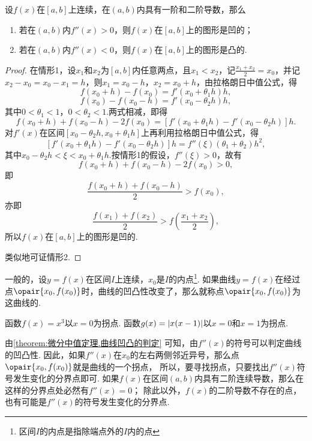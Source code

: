 \begin{theorem}[曲线凹凸的判定]\label{theorem:微分中值定理.曲线凹凸的判定}
设\(f(x)\)在\([a,b]\)上连续，在\((a,b)\)内具有一阶和二阶导数，那么
\begin{enumerate}
\item 若在\((a,b)\)内\(f''(x)>0\)，则\(f(x)\)在\([a,b]\)上的图形是凹的；
\item 若在\((a,b)\)内\(f''(x)<0\)，则\(f(x)\)在\([a,b]\)上的图形是凸的.
\end{enumerate}
\begin{proof}
在情形1，设\(x_1\)和\(x_2\)为\([a,b]\)内任意两点，且\(x_1 < x_2\)，记\(\frac{x_1 + x_2}{2} = x_0\)，并记\(x_2 - x_0 = x_0 - x_1 = h\)，则\(x_1 = x_0 - h\)，\(x_2 = x_0 + h\)，由拉格朗日中值公式，得\[
f(x_0 + h) - f(x_0) = f'(x_0 + \theta_1 h) h,
\]\[
f(x_0) - f(x_0 - h) = f'(x_0 - \theta_2 h) h,
\]其中\(0 < \theta_1 < 1\)，\(0 < \theta_2 < 1\).两式相减，即得\[
f(x_0 + h) + f(x_0 - h) - 2 f(x_0)
= [ f'(x_0 + \theta_1 h) - f'(x_0 - \theta_2 h) ] h.
\]对\(f'(x)\)在区间\([x_0 - \theta_2 h,x_0 + \theta_1 h]\)上再利用拉格朗日中值公式，得\[
[ f'(x_0 + \theta_1 h) - f'(x_0 - \theta_2 h) ] h
= f''(\xi) (\theta_1 + \theta_2) h^2,
\]其中\(x_0 - \theta_2 h < \xi < x_0 + \theta_1 h\).按情形1的假设，\(f''(\xi) > 0\)，故有\[
f(x_0 + h) + f(x_0 - h) - 2 f(x_0) > 0,
\]即\[
\frac{f(x_0 + h) + f(x_0 - h)}{2} > f(x_0),
\]亦即\[
\frac{f(x_1) + f(x_2)}{2} > f\left(\frac{x_1 + x_2}{2}\right),
\]所以\(f(x)\)在\([a,b]\)上的图形是凹的.

类似地可证情形2.
\end{proof}
\end{theorem}

\begin{definition}
一般的，设\(y=f(x)\)在区间\(I\)上连续，\(x_0\)是\(I\)的内点\footnote{区间\(I\)的内点是指除端点外的\(I\)内的点}.
如果曲线\(y=f(x)\)在经过点\(\opair{x_0,f(x_0)}\)时，曲线的凹凸性改变了，那么就称点\(\opair{x_0,f(x_0)}\)为这曲线的.
\end{definition}

\begin{example}
函数\(f(x) = x^3\)以\(x=0\)为拐点.
函数\(g(x) = \abs{x(x-1)}\)以\(x=0\)和\(x=1\)为拐点.
\end{example}

由\cref{theorem:微分中值定理.曲线凹凸的判定} 可知，由\(f''(x)\)的符号可以判定曲线的凹凸性.
因此，如果\(f''(x)\)在\(x_0\)的左右两侧邻近异号，那么点\(\opair{x_0,f(x_0)}\)就是曲线的一个拐点，
所以，要寻找拐点，只要找出\(f''(x)\)符号发生变化的分界点即可.
如果\(f(x)\)在区间\((a,b)\)内具有二阶连续导数，那么在这样的分界点处必然有\(f''(x)=0\)；
除此以外，\(f(x)\)的二阶导数不存在的点，也有可能是\(f''(x)\)的符号发生变化的分界点.

